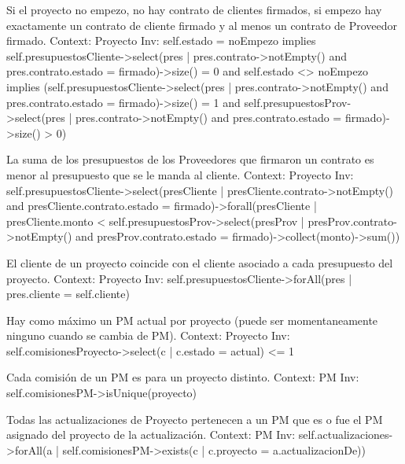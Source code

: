 \begin{listocl}
\begin{itemocl}{Si el proyecto no empezo, no hay contrato de clientes firmados, si empezo hay exactamente un contrato de cliente firmado y al menos un contrato de Proveedor firmado.}
Context: Proyecto
Inv: self.estado = noEmpezo implies self.presupuestosCliente->select(pres | pres.contrato->notEmpty() and pres.contrato.estado = firmado)->size() = 0 and self.estado <> noEmpezo implies (self.presupuestosCliente->select(pres | pres.contrato->notEmpty() and pres.contrato.estado = firmado)->size() = 1 and self.presupuestosProv->select(pres | pres.contrato->notEmpty() and pres.contrato.estado = firmado)->size() > 0)
\end{itemocl}

\begin{itemocl}{La suma de los presupuestos de los Proveedores que firmaron un contrato es menor al presupuesto que se le manda al cliente.}
Context: Proyecto
Inv: self.presupuestosCliente->select(presCliente | presCliente.contrato->notEmpty() and presCliente.contrato.estado = firmado)->forall(presCliente | presCliente.monto < self.presupuestosProv->select(presProv | presProv.contrato->notEmpty() and presProv.contrato.estado = firmado)->collect(monto)->sum())
\end{itemocl}

\begin{itemocl}{El cliente de un proyecto coincide con el cliente asociado a cada presupuesto del proyecto.}
Context: Proyecto
Inv: self.presupuestosCliente->forAll(pres | pres.cliente = self.cliente)
\end{itemocl}

\begin{itemocl}{Hay como máximo un PM actual por proyecto (puede ser momentaneamente ninguno cuando se cambia de PM).}
Context: Proyecto
Inv: self.comisionesProyecto->select(c | c.estado = actual) <= 1
\end{itemocl}

\begin{itemocl}{Cada comisión de un PM es para un proyecto distinto.}
Context: PM
Inv: self.comisionesPM->isUnique(proyecto)
\end{itemocl}

\begin{itemocl}{Todas las actualizaciones de Proyecto pertenecen a un PM que es o fue el PM asignado del proyecto de la actualización.}
Context: PM
Inv: self.actualizaciones->forAll(a | self.comisionesPM->exists(c | c.proyecto = a.actualizacionDe))
\end{itemocl}


\end{listocl}
